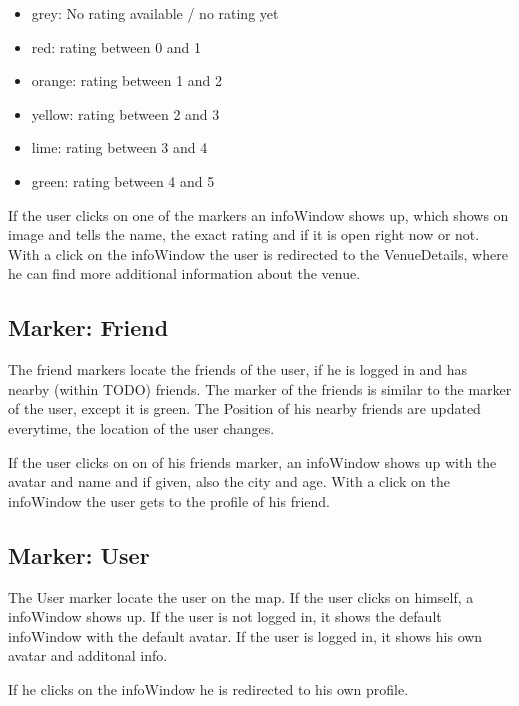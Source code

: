 \begin{itemize}
\item grey: No rating available / no rating yet
\item red: rating between 0 and 1
\item orange: rating between 1 and 2
\item yellow: rating between 2 and 3
\item lime: rating between 3 and 4
\item green: rating between 4 and 5
\end{itemize}

If the user clicks on one of the markers an infoWindow shows up, which shows on image and tells the name, the exact rating and if it is open right now or not. With a click on the infoWindow the user is redirected to the VenueDetails, where he can find more additional information about the venue.

\subsection{Marker: Friend}
The friend markers locate the friends of the user, if he is logged in and has nearby (within TODO) friends. The marker of the friends is similar to the marker of the user, except it is green.
The Position of his nearby friends are updated everytime, the location of the user changes. 

If the user clicks on on of his friends marker, an infoWindow shows up with the avatar and name and if given, also the city and age. With a click on the infoWindow the user gets to the profile of his friend.

\subsection{Marker: User}
The User marker locate the user on the map. If the user clicks on himself, a infoWindow shows up. If the user is not logged in, it shows the default infoWindow with the default avatar. If the user is logged in, it shows his own avatar and additonal info. 

If he clicks on the infoWindow he is redirected to his own profile.

 



